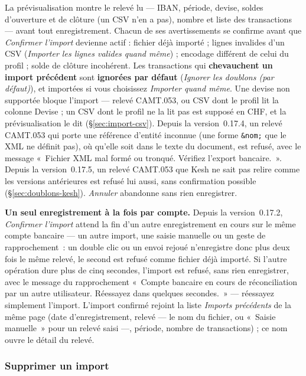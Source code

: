 \documentclass[a4paper,11pt,oneside]{article}
\begin{document}
La prévisualisation montre le relevé lu --- IBAN, période, devise, soldes d'ouverture et de
clôture (un CSV n'en a pas), nombre et liste des transactions --- avant tout enregistrement.
Chacun de ses avertissements se confirme avant que \emph{Confirmer l'import} devienne actif :
fichier déjà importé ; lignes invalides d'un CSV (\emph{Importer les lignes valides quand
même}) ; encodage différent de celui du profil ; solde de clôture incohérent. Les transactions
qui \textbf{chevauchent un import précédent} sont \textbf{ignorées par défaut}
(\emph{Ignorer les doublons (par défaut)}), et importées si vous choisissez \emph{Importer quand
même}. Une devise non supportée bloque l'import — relevé CAMT.053, ou CSV dont le profil lit la
colonne Devise ; un CSV dont le profil ne la lit pas est supposé en CHF, et la prévisualisation le
dit (\S\ref{sec:import-csv}). Depuis la version~0.17.4, un relevé CAMT.053 qui porte une
référence d'entité inconnue (une forme \texttt{\&nom;} que le XML ne définit pas), où qu'elle soit
dans le texte du document, est refusé, avec le message «~Fichier XML mal formé ou tronqué. Vérifiez
l'export bancaire.~». Depuis la version~0.17.5, un relevé CAMT.053 que Kesh ne sait pas relire comme
les versions antérieures est refusé lui aussi, sans confirmation possible
(\S\ref{sec:doublons-kesh}). \emph{Annuler} abandonne sans rien enregistrer.

\textbf{Un seul enregistrement à la fois par compte.} Depuis la version~0.17.2, \emph{Confirmer
l'import} attend la fin d'un autre enregistrement en cours sur le même compte bancaire --- un
autre import, une saisie manuelle ou un geste de rapprochement~: un double clic ou un envoi
rejoué n'enregistre donc plus deux fois le même relevé, le second est refusé comme fichier déjà
importé. Si l'autre opération dure plus de cinq secondes, l'import est refusé, sans rien
enregistrer, avec le message du rapprochement «~Compte bancaire en cours de réconciliation par un autre
utilisateur. Réessayez dans quelques secondes.~» --- réessayez simplement l'import.
L'import confirmé rejoint la liste \emph{Imports précédents} de la même page (date
d'enregistrement, relevé --- le nom du fichier, ou «~Saisie manuelle~» pour un relevé saisi ---,
période, nombre de transactions) ; ce nom ouvre le détail du relevé.

\subsubsection{Supprimer un import}\label{sec:supprimer-import}
\end{document}
